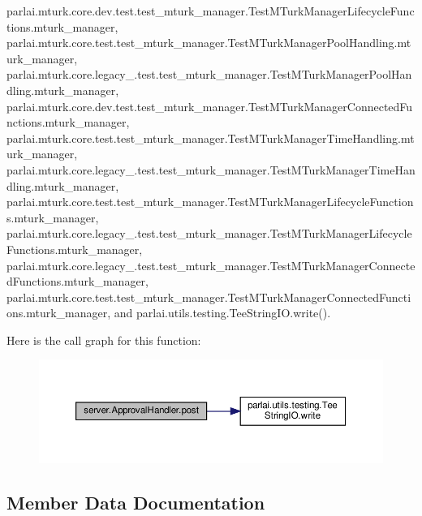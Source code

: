 parlai.\+mturk.\+core.\+dev.\+test.\+test\+\_\+mturk\+\_\+manager.\+Test\+M\+Turk\+Manager\+Lifecycle\+Functions.\+mturk\+\_\+manager, parlai.\+mturk.\+core.\+test.\+test\+\_\+mturk\+\_\+manager.\+Test\+M\+Turk\+Manager\+Pool\+Handling.\+mturk\+\_\+manager, parlai.\+mturk.\+core.\+legacy\+\_.\+test.\+test\+\_\+mturk\+\_\+manager.\+Test\+M\+Turk\+Manager\+Pool\+Handling.\+mturk\+\_\+manager, parlai.\+mturk.\+core.\+dev.\+test.\+test\+\_\+mturk\+\_\+manager.\+Test\+M\+Turk\+Manager\+Connected\+Functions.\+mturk\+\_\+manager, parlai.\+mturk.\+core.\+test.\+test\+\_\+mturk\+\_\+manager.\+Test\+M\+Turk\+Manager\+Time\+Handling.\+mturk\+\_\+manager, parlai.\+mturk.\+core.\+legacy\+\_.\+test.\+test\+\_\+mturk\+\_\+manager.\+Test\+M\+Turk\+Manager\+Time\+Handling.\+mturk\+\_\+manager, parlai.\+mturk.\+core.\+test.\+test\+\_\+mturk\+\_\+manager.\+Test\+M\+Turk\+Manager\+Lifecycle\+Functions.\+mturk\+\_\+manager, parlai.\+mturk.\+core.\+legacy\+\_.\+test.\+test\+\_\+mturk\+\_\+manager.\+Test\+M\+Turk\+Manager\+Lifecycle\+Functions.\+mturk\+\_\+manager, parlai.\+mturk.\+core.\+legacy\+\_.\+test.\+test\+\_\+mturk\+\_\+manager.\+Test\+M\+Turk\+Manager\+Connected\+Functions.\+mturk\+\_\+manager, parlai.\+mturk.\+core.\+test.\+test\+\_\+mturk\+\_\+manager.\+Test\+M\+Turk\+Manager\+Connected\+Functions.\+mturk\+\_\+manager, and parlai.\+utils.\+testing.\+Tee\+String\+I\+O.\+write().

Here is the call graph for this function\+:
\nopagebreak
\begin{figure}[H]
\begin{center}
\leavevmode
\includegraphics[width=350pt]{classserver_1_1ApprovalHandler_ac4bf954a99f21508d776129b209b1488_cgraph}
\end{center}
\end{figure}


\subsection{Member Data Documentation}
\mbox{\label{classserver_1_1ApprovalHandler_abf033570928f1b8b2808a16cfa54f655}} 
